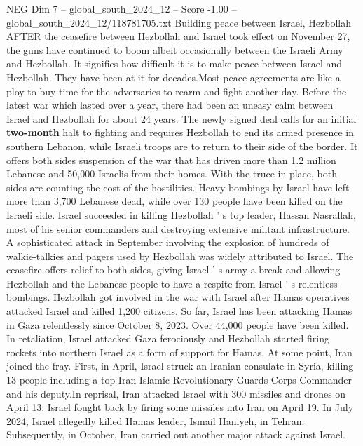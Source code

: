 \begin{textsample}{NEG Dim 7 – global\_south\_2024\_12 – Score -1.00 – global\_south\_2024\_12/118781705.txt}  \label{ex:f7_neg_108}
Building peace between Israel, Hezbollah AFTER the ceasefire between Hezbollah and Israel took effect on November 27, the guns have continued to boom albeit occasionally between the Israeli Army and Hezbollah.
It signifies how difficult it is to make peace between Israel and Hezbollah.
They have been at it for decades.Most peace agreements are like a ploy to buy time for the adversaries to rearm and fight another day.
Before the latest war which lasted over a year, there had been an uneasy calm between Israel and Hezbollah for about 24 years.
The newly signed deal calls for an initial \textbf{two-month} halt to fighting and requires Hezbollah to end its armed presence in southern Lebanon, while Israeli troops are to return to their side of the border.
It offers both sides suspension of the war that has driven more than 1.2 million Lebanese and 50,000 Israelis from their homes.
With the truce in place, both sides are counting the cost of the hostilities.
Heavy bombings by Israel have left more than 3,700 Lebanese dead, while over 130 people have been killed on the Israeli side.
Israel succeeded in killing Hezbollah ' s top leader, Hassan Nasrallah, most of his senior commanders and destroying extensive militant infrastructure.
A sophisticated attack in September involving the explosion of hundreds of walkie-talkies and pagers used by Hezbollah was widely attributed to Israel.
The ceasefire offers relief to both sides, giving Israel ' s army a break and allowing Hezbollah and the Lebanese people to have a respite from Israel ' s relentless bombings.
Hezbollah got involved in the war with Israel after Hamas operatives attacked Israel and killed 1,200 citizens.
So far, Israel has been attacking Hamas in Gaza relentlessly since October 8, 2023.
Over 44,000 people have been killed.
In retaliation, Israel attacked Gaza ferociously and Hezbollah started firing rockets into northern Israel as a form of support for Hamas.
At some point, Iran joined the fray.
First, in April, Israel struck an Iranian consulate in Syria, killing 13 people including a top Iran Islamic Revolutionary Guards Corps Commander and his deputy.In reprisal, Iran attacked Israel with 300 missiles and drones on April 13.
Israel fought back by firing some missiles into Iran on April 19.
In July 2024, Israel allegedly killed Hamas leader, Ismail Haniyeh, in Tehran.
Subsequently, in October, Iran carried out another major attack against Israel.

\end{textsample}
